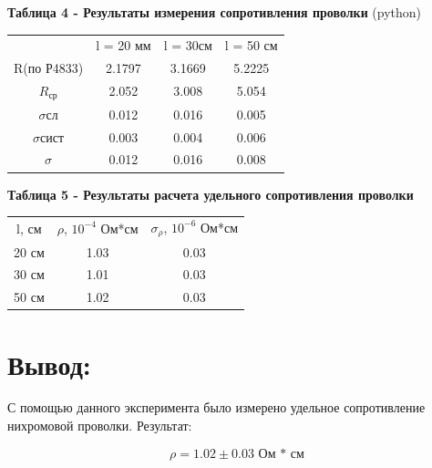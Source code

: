 \documentclass[12pt]{extarticle}
\begin{document}
\newpage 

\textbf{\large Таблица 4 - Результаты измерения сопротивления проволки} (python)

\vspace{5mm}

\begin{tabular}{cccc}
     & l = 20 мм& l = 30см & l = 50 см\\
    R(по Р4833) & 2.1797 & 3.1669 & 5.2225\\
    $R_{\text{ср}}$&2.052 & 3.008 & 5.054\\
    $\sigma{\text{сл}}$& 0.012 & 0.016 & 0.005\\
    $\sigma{\text{сист}}$& 0.003 & 0.004 & 0.006\\
    $\sigma$& 0.012 & 0.016 & 0.008\\

\end{tabular}

\textbf{\large Таблица 5 - Результаты расчета удельного сопротивления проволки}

\vspace{5mm}

\begin{tabular}{ccc}
    l, см & $\rho$, $10^{-4}$ Ом*см & $\sigma_{\rho}$, $10^{-6}$ Ом*см\\
    20 см & 1.03 & 0.03\\
    30 см & 1.01 & 0.03\\
    50 см & 1.02 & 0.03\\

\end{tabular}

\section{Вывод:}

С помощью данного эксперимента было измерено удельное сопротивление нихромовой проволки.
Результат:

$$\rho = 1.02 \pm 0.03 \text{ Ом * см}$$ 
\end{document}
